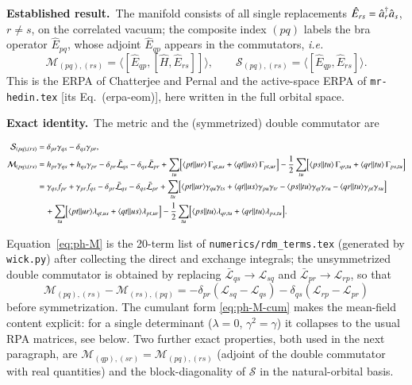 \documentclass[aip,jcp,reprint,noshowkeys,superscriptaddress]{revtex4-1}
\newcommand{\ie}{\textit{i.e.}}
\newcommand{\cre}[1]{\Hat{a}_{#1}^{\dag}}
\newcommand{\ani}[1]{\Hat{a}_{#1}}
\newcommand{\bcalS}{\boldsymbol{\mathcal S}}
\newcommand{\Lag}{\mathcal{L}}
\newcommand{\sLag}{\bar{\mathcal L}}
\newcommand{\Exact}{\textbf{Exact identity.}\ }
\newcommand{\Established}{\textbf{Established result.}\ }
\begin{document}
\Established The manifold consists of all single replacements
$\hat E_{rs}=\cre{r}\ani{s}$, $r\ne s$, on the correlated vacuum; the
composite index $(pq)$ labels the bra operator $\hat E_{pq}$, whose adjoint
$\hat E_{qp}$ appears in the commutators, \ie\
\begin{equation}
  \mathcal M_{(pq),(rs)}=\langle[\hat E_{qp},[\hat H,\hat E_{rs}]]\rangle ,
  \qquad
  \mathcal S_{(pq),(rs)}=\langle[\hat E_{qp},\hat E_{rs}]\rangle .
  \label{eq:ph-def}
\end{equation}
This is the ERPA of Chatterjee and Pernal \cite{ChatterjeePernal2012} and the
active-space ERPA of \texttt{mr-hedin.tex} [its Eq.~(erpa-eom)], here written
in the full orbital space.

\Exact The metric and the (symmetrized) double commutator are
\begin{widetext}
\begin{align}
  \mathcal S_{(pq),(rs)}&=\delta_{pr}\gamma_{qs}-\delta_{qs}\gamma_{pr},
  \label{eq:ph-S}\\
  \mathcal M_{(pq),(rs)}&=
  h_{pr}\gamma_{qs}+h_{qs}\gamma_{pr}-\delta_{pr}\sLag_{qs}-\delta_{qs}\sLag_{pr}
  +\sum_{tu}\Bigl[\langle pt||ur\rangle\,\Gamma_{qt,us}+\langle qt||us\rangle\,\Gamma_{pt,ur}\Bigr]
  -\frac12\sum_{tu}\Bigl[\langle ps||tu\rangle\,\Gamma_{qr,tu}+\langle qr||tu\rangle\,\Gamma_{ps,tu}\Bigr]
  \label{eq:ph-M}\\
  &=\gamma_{qs}f_{pr}+\gamma_{pr}f_{qs}-\delta_{pr}\sLag_{qs}-\delta_{qs}\sLag_{pr}
  +\sum_{tu}\Bigl[\langle pt||ur\rangle\gamma_{qu}\gamma_{ts}+\langle qt||us\rangle\gamma_{pu}\gamma_{tr}
  -\langle ps||tu\rangle\gamma_{qt}\gamma_{ru}-\langle qr||tu\rangle\gamma_{pt}\gamma_{su}\Bigr]
  \nonumber\\
  &\quad
  +\sum_{tu}\Bigl[\langle pt||ur\rangle\lambda_{qt,us}+\langle qt||us\rangle\lambda_{pt,ur}\Bigr]
  -\frac12\sum_{tu}\Bigl[\langle ps||tu\rangle\lambda_{qr,tu}+\langle qr||tu\rangle\lambda_{ps,tu}\Bigr].
  \label{eq:ph-M-cum}
\end{align}
\end{widetext}
Equation~\eqref{eq:ph-M} is the 20-term list of \texttt{numerics/rdm\_terms.tex}
(generated by \texttt{wick.py}) after collecting the direct and exchange
integrals; the unsymmetrized double commutator is obtained by replacing
$\sLag_{qs}\to\Lag_{sq}$ and $\sLag_{pr}\to\Lag_{rp}$, so that
\begin{equation}
  \mathcal M_{(pq),(rs)}-\mathcal M_{(rs),(pq)}
  =-\delta_{pr}(\Lag_{sq}-\Lag_{qs})-\delta_{qs}(\Lag_{rp}-\Lag_{pr})
  \label{eq:ph-asym}
\end{equation}
before symmetrization.  The cumulant form \eqref{eq:ph-M-cum} makes the
mean-field content explicit: for a single determinant ($\lambda=0$,
$\gamma^2=\gamma$) it collapses to the usual RPA matrices, see below.
Two further exact properties, both used in the next paragraph, are
$\mathcal M_{(qp),(sr)}=\mathcal M_{(pq),(rs)}$ (adjoint of the double
commutator with real quantities) and the block-diagonality of $\bcalS$ in the
natural-orbital basis.
\end{document}
